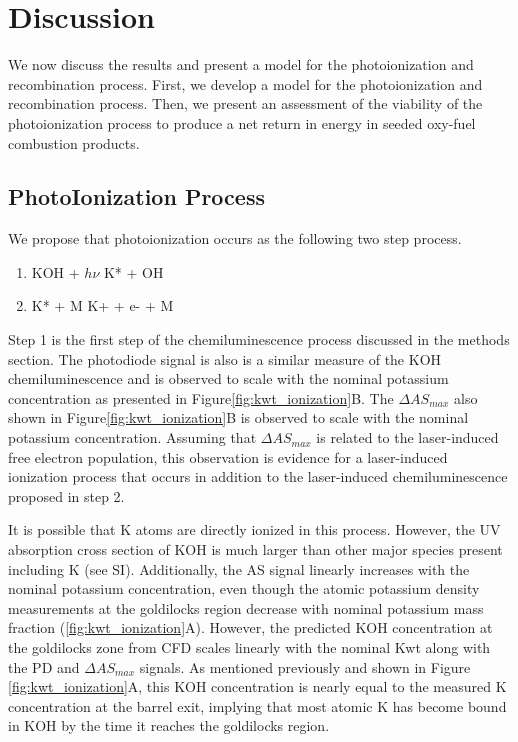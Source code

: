 \section{Discussion}

We now discuss the results and present a model for the photoionization and recombination process. First, we develop a model for the photoionization and recombination process. Then, we present an assessment of the viability of the photoionization process to produce a net return in energy in seeded oxy-fuel combustion products.

\subsection{PhotoIonization Process}

We propose that photoionization occurs as the following two step process. 

\begin{enumerate}
\item KOH + $h\nu$ \rightarrow K* + OH
\item K* + M \rightarrow K+ + e- + M
\end{enumerate}



Step 1 is the first step of the chemiluminescence process discussed in the methods section. The photodiode signal is also is a similar measure of the KOH chemiluminescence and is observed to scale with the nominal potassium concentration as presented in Figure\ref{fig:kwt_ionization}B. The $\Delta AS_{max}$ also shown in Figure\ref{fig:kwt_ionization}B is observed to scale with the nominal potassium concentration. Assuming that $\Delta AS_{max}$ is related to the laser-induced free electron population, this observation is evidence for a laser-induced ionization process that occurs in addition to the laser-induced chemiluminescence proposed in step 2. 

It is possible that K atoms are directly ionized in this process. However, the UV absorption cross section of KOH is much larger than other major species present including K (see SI). Additionally, the AS signal linearly increases with the nominal potassium concentration, even though the atomic potassium density measurements at the goldilocks region decrease with nominal potassium mass fraction (\ref{fig:kwt_ionization}A). However, the predicted KOH concentration at the goldilocks zone from CFD scales linearly with the nominal Kwt along with the PD and $\Delta AS_{max}$ signals. As mentioned previously and shown in Figure \ref{fig:kwt_ionization}A, this KOH concentration is nearly equal to the measured K concentration at the barrel exit, implying that most atomic K has become bound in KOH by the time it reaches the goldilocks region.

